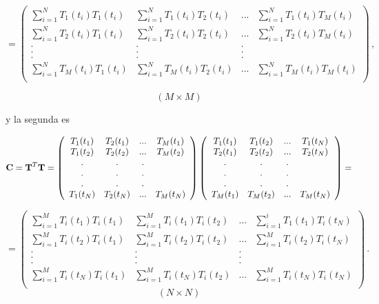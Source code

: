 \documentclass[
]{agujournal2019}
\begin{document}
\[=\left(\begin{array}{cccc}
   \sum\limits_{i=1}^N{T_{1}(t_i)T_{1}(t_i)} & \sum\limits_{i=1}^N{T_{1}(t_i)T_{2}(t_i)} & ... & \sum\limits_{i=1}^N{T_{1}(t_i)T_{M}(t_i)}\\
   \sum\limits_{i=1}^N{T_{2}(t_i)T_{1}(t_i)} & \sum\limits_{i=1}^N{T_{2}(t_i)T_{2}(t_i)} & ... & \sum\limits_{i=1}^N{T_{2}(t_i)T_{M}(t_i)}\\
                . & . & . \\
        . & . & . \\
        . & . & . \\
   \sum\limits_{i=1}^N{T_{M}(t_i)T_{1}(t_i)} & \sum\limits_{i=1}^N{T_{M}(t_i)T_{2}(t_i)} & ... & \sum\limits_{i=1}^N{T_{M}(t_i)T_{M}(t_i)}\\
        \end{array}\right)\,,\]

\[\left( M \times M \right)\]

y la segunda es

\[{\textbf C}={\textbf T}^T{\textbf T}=
\left(\begin{array}{cccc}
   T_{1}(t_1) & T_{2}(t_1) & ... & T_{M}(t_1)\\
   T_{1}(t_2) & T_{2}(t_2) & ... & T_{M}(t_2)\\
                . & . & . \\
        . & . & . \\
        . & . & . \\
   T_{1}(t_N) & T_{2}(t_N) & ... & T_{M}(t_N)\\
        \end{array}\right)\left(\begin{array}{cccc}
   T_{1}(t_1) & T_{1}(t_2) & ... & T_{1}(t_N)\\
   T_{2}(t_1) & T_{2}(t_2) & ... & T_{2}(t_N)\\
                . & . & . \\
        . & . & . \\
        . & . & . \\
   T_{M}(t_1) & T_{M}(t_2) & ... & T_{M}(t_N)\\
\end{array}\right)=\]

\[=\left(\begin{array}{cccc}
   \sum\limits_{i=1}^M{T_{i}(t_1)T_{i}(t_1)} & \sum\limits_{i=1}^M{T_{i}(t_1)T_{i}(t_2)} & ... & \sum\limits_{i=1}^i{T_{1}(t_1)T_{i}(t_N)}\\
   \sum\limits_{i=1}^M{T_{i}(t_2)T_{i}(t_1)} & \sum\limits_{i=1}^M{T_{i}(t_2)T_{i}(t_2)} & ... & \sum\limits_{i=1}^M{T_{i}(t_2)T_{i}(t_N)}\\
                . & . & . \\
        . & . & . \\
        . & . & . \\
   \sum\limits_{i=1}^M{T_{i}(t_N)T_{i}(t_1)} & \sum\limits_{i=1}^M{T_{i}(t_N)T_{i}(t_2)} & ... & \sum\limits_{i=1}^M{T_{i}(t_N)T_{i}(t_N)}\\
        \end{array}\right)\,.\] \[\left( N \times N \right)\]
\end{document}
